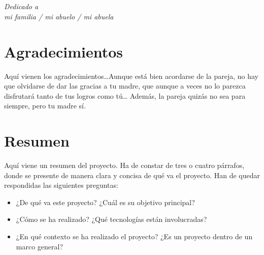 \documentclass[a4paper, 12pt]{book}
\begin{document}

\chapter*{}
\begin{flushright}
\textit{Dedicado a \\
mi familia / mi abuelo / mi abuela}
\end{flushright}


\chapter*{Agradecimientos}

Aquí vienen los agradecimientos\ldots Aunque está bien acordarse de la pareja, no hay que olvidarse de dar las gracias a tu madre, que aunque a veces no lo parezca disfrutará tanto de tus logros como tú\ldots 
Además, la pareja quizás no sea para siempre, pero tu madre sí.


\chapter*{Resumen}

Aquí viene un resumen del proyecto.
Ha de constar de tres o cuatro párrafos, donde se presente de manera clara y concisa de qué va el proyecto. 
Han de quedar respondidas las siguientes preguntas:

\begin{itemize}
  \item ¿De qué va este proyecto? ¿Cuál es su objetivo principal?
  \item ¿Cómo se ha realizado? ¿Qué tecnologías están involucradas?
  \item ¿En qué contexto se ha realizado el proyecto? ¿Es un proyecto dentro de un marco general?
\end{itemize}
\end{document}
